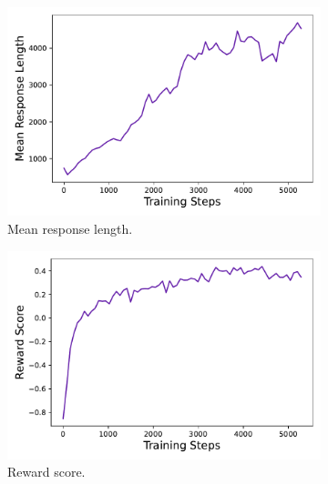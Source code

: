 \begin{figure}[t]
    \centering
    \begin{subfigure}{0.45\textwidth}
        \centering
        \includegraphics[width=\textwidth]{figures/length.pdf}
        \caption{Mean response length.}
        \label{subfig:length}
    \end{subfigure}
    \hfill
    \begin{subfigure}{0.45\textwidth}
        \centering
        \includegraphics[width=\textwidth]{figures/reward.pdf}
        \caption{Reward score.}
        \label{subfig:reward}
    \end{subfigure}
    \begin{subfigure}{0.45\textwidth}
        \centering

\end{subfigure}
\end{figure}
